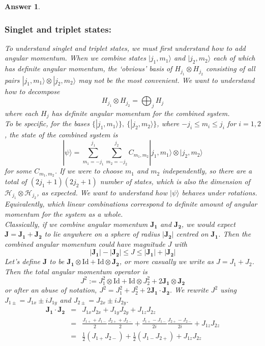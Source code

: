 \documentclass[a4paper]{article}
\newtheorem{ans}{Answer}[subsection]
\theoremstyle{new}
\begin{document}
\begin{ans}
\subsubsection*{Singlet and triplet states:}
To understand singlet and triplet states, we must first understand how to add angular momentum. When we combine states $|j_1,m_1\rangle$ and $|j_2,m_2\rangle$ each of which has definite angular momentum, the `obvious' basis of $H_{j_1}\otimes H_{j_2}$ consisting of all pairs $|j_1,m_1\rangle\otimes|j_2,m_2\rangle$ may not be the most convenient. We want to understand how to decompose $$H_{j_1}\otimes H_{j_2}=\bigoplus_jH_j$$ where each $H_j$ has definite angular momentum for the combined system.\\[5pt]
To be specific, for the bases  $\{|j_1,m_1\rangle\},~\{|j_2,m_2\rangle\}$, where $-j_i\leq m_i\leq j_i$ for $i=1,2$, the state of the combined system is
$$|\psi\rangle=\sum_{m_1=-j_1}^{j_1}\sum_{m_2=-j_2}^{j_2}C_{m_1,m_2}|j_1,m_1\rangle\otimes|j_2,m_2\rangle$$
for some $C_{m_1,m_2}$. If we were to choose $m_1$ and $m_2$ independently, so there are a total of $(2j_1+1)(2j_2+1)$ number of states, which is also the dimension of $\mathcal{H}_{j_1}\otimes\mathcal{H}_{j_2}$, as expected. We want to understand how $|\psi\rangle$ behaves under rotations. Equivalently, which linear combinations correspond to definite amount of angular momentum for the system as a whole.\\[5pt]
Classically, if we combine angular momentum $\mathbf{J_1}$ and $\mathbf{J_2}$, we would expect $\mathbf{J}=\mathbf{J_1}+\mathbf{J_2}$ to lie anywhere on a sphere of radius $|\mathbf{J_2}|$ centred on $\mathbf{J_1}$. Then the combined angular momentum could have magnitude $J$ with
$$|\mathbf{J_1}|-|\mathbf{J_2}|\leq J\leq|\mathbf{J_1}|+|\mathbf{J_2}|$$
Let's define $\mathbf{J}$ to be $\mathbf{J_1}\otimes\text{Id}+\text{Id}\otimes\mathbf{J_2}$, or more casually we write as $J=J_1+J_2$. Then the total angular momentum operator is
$$J^2:=J_1^2\otimes\text{Id}+\text{Id}\otimes J_2^2+2\mathbf{J_1}\otimes\mathbf{J_2}$$
or after an abuse of notation, $J^2=J_1^2+J_2^2+2\mathbf{J_1}\cdot\mathbf{J_2}$. We rewrite $J^2$ using $J_{1\pm}=J_{1x}\pm iJ_{1y}$ and $J_{2\pm}=J_{2x}\pm i J_{2y}$.
\begin{eqnarray}
\mathbf{J_1}\cdot\mathbf{J_2}&=&J_{1x}J_{2x}+J_{1y}J_{2y}+J_{1z}J_{2z}\nonumber\\&=&\frac{J_{1+}+J_{1-}}{2}\frac{J_{2+}+J_{2-}}{2}+\frac{J_{1+}-J_{1-}}{2i}\frac{J_{2+}-J_{2-}}{2i}+J_{1z} J_{2z}\nonumber\\&=&\frac{1}{2}(J_{1+} J_{2-})+\frac{1}{2}(J_{1-} J_{2+})+J_{1z}J_{2z}\nonumber

\end{eqnarray}
\end{ans}
\end{document}
